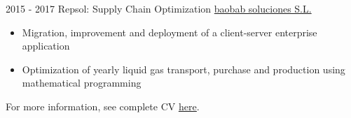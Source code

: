 \documentclass[letterpaper]{twentysecondcv} %
\begin{document}
\begin{twenty}
  \twentyitem
      {2015 - 2017 }
    {}
        {Repsol: Supply Chain Optimization}
        {\href{https://baobabsoluciones.es/en/}{baobab soluciones S.L.}}
        {}
        {
        {\begin{itemize}
        \item Migration, improvement and deployment of a client-server enterprise application
        \item Optimization of yearly liquid gas transport, purchase and production using mathematical programming
        \vspace{2mm}
        \end{itemize}}
        }
\end{twenty}

For more information, see complete CV \underline{\href{https://europa.eu/europass/eportfolio/screen/share/195f20ef-10e7-495c-8f68-e2aab2e298da?lang=en}{here}}.
\end{document}
